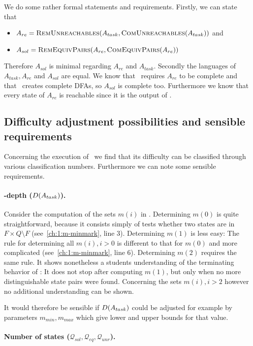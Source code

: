 We do some rather formal statements and requirements. Firstly, we can state that
\begin{itemize}
	\item $A_{re} = \textsc{RemUnreachables}(A_{task}, \textsc{ComUnreachables}(A_{task}))$ and
	\item $A_{sol} = \textsc{RemEquivPairs}(A_{re}, \textsc{ComEquivPairs}(A_{re}))$
\end{itemize}
Therefore $A_{sol}$ is minimal regarding $A_{re}$ and $A_{task}$. Secondly the languages of $A_{task}, A_{re}$ and $A_{sol}$ are equal. We know that \CompDist\ requires $A_{re}$ to be complete and that \RemEq\ creates complete DFAs, so $A_{sol}$ is complete too. Furthermore we know that every state of $A_{re}$ is reachable since it is the output of \RemUnr.

\subsection{Difficulty adjustment possibilities and sensible requirements}\label{ch:1:requirements-analysis}

Concerning the execution of \MinAlg\ we find that its difficulty can be classified through various classification numbers. Furthermore we can note some sensible requirements.

\paragraph*{\CompDist-depth ($D(A_{task})$).}

Consider the computation of the sets $m(i)$ in \CompDist. Determining $m(0)$ is quite straightforward, because it consists simply of tests whether two states are in $F \times Q \setminus F$ (see~\ref{ch:1:m-minmark}, line 3). Determining $m(1)$ is less easy: The rule for determining all $m(i), i > 0$ is different to that for $m(0)$ and more complicated (see~\ref{ch:1:m-minmark}, line 6). Determining $m(2)$ requires the same rule. It shows nonetheless a students understanding of the terminating behavior of \CompDist: It does not stop after computing $m(1)$, but only when no more distinguishable state pairs were found. Concerning the sets $m(i), i > 2$ however no additional understanding can be shown.

It would therefore be sensible if $D(A_{task})$ could be adjusted for example by parameters $m_{min}, m_{max}$ which give lower and upper bounds for that value.

\paragraph*{Number of states ($\mathcal{Q}_{sol}, \mathcal{Q}_{eq}, \mathcal{Q}_{unr}$).}

